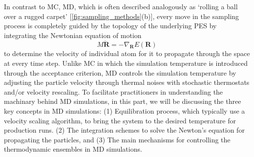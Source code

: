 
In contrast to MC, MD, which is often described analogously as `rolling a ball over a rugged carpet'  [\cref{fig:sampling_methods}(b)], every move in the sampling process is completely guided by the topology of the underlying PES by integrating the Newtonian equation of motion
\begin{equation}
    \label{eq:Newtonian}
    M\ddot{\bm{R}}=-\nabla_{\bm{R}}E(\bm{R})
\end{equation}
to determine the velocity of individual atom for it to propagate through the space at every time step. Unlike MC in which the simulation temperature is introduced through the acceptance criterion, MD controls the simulation temperature by adjusting the particle velocity through thermal noises with stochastic thermostats and/or velocity rescaling. To facilitate practitioners in understanding the machinary behind MD simulations, in this part, we will be discussing the three key concepts in MD simulations: (1) Equilibration process, which typically use a velocity scaling algorithm, to bring the system to the desired temperature for production runs. (2) The integration schemes to solve the Newton's equation for propagating the particles, and (3) The main mechanisms for controlling the thermodynamic ensembles in MD simulations.


